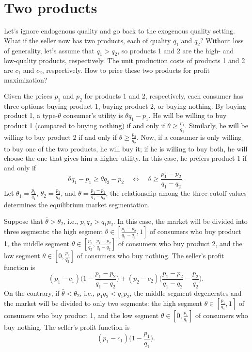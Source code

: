 \documentclass[12pt,a4paper]{article}
\begin{document}
\section{Two products}

Let's ignore endogenous quality and go back to the exogenous quality setting. 
What if the seller now has two products, each of quality $q_1$ and $q_2$? 
Without loss of generality, let's assume that $q_1 > q_2$, 
so products 1 and 2 are the high- and low-quality products, respectively. 
The unit production costs of products 1 and 2 are $c_1$ and $c_2$, respectively. 
How to price these two products for profit maximization? 

Given the prices $p_1$ and $p_2$ for products 1 and 2, respectively, 
each consumer has three options: buying product 1, buying product 2, 
or buying nothing. By buying product 1, a type-$\theta$ consumer's utility 
is $\theta q_1 - p_1$. He will be willing to buy product 1 (compared to 
buying nothing) if and only if $\theta \geq \frac{p_1}{q_1}$. 
Similarly, he will be willing to buy product 2 if and only if 
$\theta \geq \frac{p_2}{q_2}$. Now, if a consumer is only willing to buy
one of the two products, he will buy it; if he is willing to buy both, 
he will choose the one that gives him a higher utility. 
In this case, he prefers product 1 if and only if 
\[
	\theta q_1 - p_1 \geq \theta q_2 - p_2 \quad\Leftrightarrow\quad
	\theta \geq \frac{p_1 - p_2}{q_1 - q_2}. 
\]
Let $\theta_1 = \frac{p_1}{q_1}$, $\theta_2 = \frac{p_2}{q_2}$, 
and $\bar{\theta} = \frac{p_1 - p_2}{q_1 - q_2}$, the relationship
among the three cutoff values determines the equilibrium market segmentation. 

Suppose that $\bar{\theta} > \theta_2$, i.e., $p_1q_2 > q_1p_2$. 
In this case, the market will be divided into three segments: 
the high segment $\theta \in [\frac{p_1 - p_2}{q_1 - q_2}, 1]$ of consumers
who buy product 1, 
the middle segment $\theta \in [\frac{p_2}{q_2}, \frac{p_1 - p_2}{q_1 - q_2}]$
of consumers who buy product 2, and 
the low segment $\theta \in [0, \frac{p_2}{q_2}]$ of consumers who buy nothing. 
The seller's profit function is 
\[
	(p_1 - c_1)\bigg(1 - \frac{p_1 - p_2}{q_1 - q_2}\bigg)
	+ (p_2 - c_2)\bigg(\frac{p_1 - p_2}{q_1 - q_2} - \frac{p_2}{q_2}\bigg).
\]
On the contrary, if $\bar{\theta} < \theta_2$, i.e., $p_1q_2 < q_1p_2$,  
the middle segment degenerates and the market will be divided to only two segments: 
the high segment $\theta \in [\frac{p_1}{q_1}, 1]$ of consumers
who buy product 1, and 
the low segment $\theta \in [0, \frac{p_1}{q_1}]$ of consumers who buy nothing. 
The seller's profit function is 
\[
	(p_1 - c_1)\bigg(1 - \frac{p_1}{q_1}\bigg). 
\]
\end{document}
